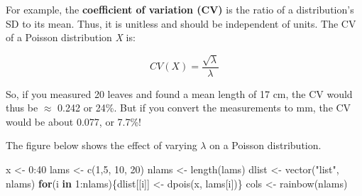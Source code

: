 \documentclass[
  13,
  letterpaper,
]{report}
\newenvironment{Shaded}{\begin{snugshade}}{\end{snugshade}}
\newcommand{\ControlFlowTok}[1]{\textcolor[rgb]{0.00,0.23,0.31}{\textbf{#1}}}
\newcommand{\DecValTok}[1]{\textcolor[rgb]{0.68,0.00,0.00}{#1}}
\newcommand{\FunctionTok}[1]{\textcolor[rgb]{0.28,0.35,0.67}{#1}}
\newcommand{\NormalTok}[1]{\textcolor[rgb]{0.00,0.23,0.31}{#1}}
\newcommand{\OtherTok}[1]{\textcolor[rgb]{0.00,0.23,0.31}{#1}}
\newcommand{\SpecialCharTok}[1]{\textcolor[rgb]{0.37,0.37,0.37}{#1}}
\newcommand{\StringTok}[1]{\textcolor[rgb]{0.13,0.47,0.30}{#1}}
\begin{document}
For example, the \textbf{coefficient of variation (CV)} is the ratio of
a distribution's SD to its mean. Thus, it is unitless and should be
independent of units. The CV of a Poisson distribution \emph{X} is:

\[CV\left(X\right)=\frac{\sqrt\lambda}{\lambda}\]

So, if you measured 20 leaves and found a mean length of 17 cm, the CV
would thus be \(\approx\) 0.242 or 24\%. But if you convert the
measurements to mm, the CV would be about 0.077, or 7.7\%!

The figure below shows the effect of varying \(\lambda\) on a Poisson
distribution.

\begin{Shaded}
\begin{Highlighting}[]
\NormalTok{x }\OtherTok{\textless{}{-}} \DecValTok{0}\SpecialCharTok{:}\DecValTok{40}
\NormalTok{lams }\OtherTok{\textless{}{-}} \FunctionTok{c}\NormalTok{(}\DecValTok{1}\NormalTok{,}\DecValTok{5}\NormalTok{, }\DecValTok{10}\NormalTok{, }\DecValTok{20}\NormalTok{)}
\NormalTok{nlams }\OtherTok{\textless{}{-}} \FunctionTok{length}\NormalTok{(lams)}
\NormalTok{dlist }\OtherTok{\textless{}{-}} \FunctionTok{vector}\NormalTok{(}\StringTok{"list"}\NormalTok{, nlams)}
\ControlFlowTok{for}\NormalTok{(i }\ControlFlowTok{in} \DecValTok{1}\SpecialCharTok{:}\NormalTok{nlams)\{dlist[[i]] }\OtherTok{\textless{}{-}} \FunctionTok{dpois}\NormalTok{(x, lams[i])\}}
\NormalTok{cols }\OtherTok{\textless{}{-}} \FunctionTok{rainbow}\NormalTok{(nlams)}


\end{Highlighting}
\end{Shaded}
\end{document}
